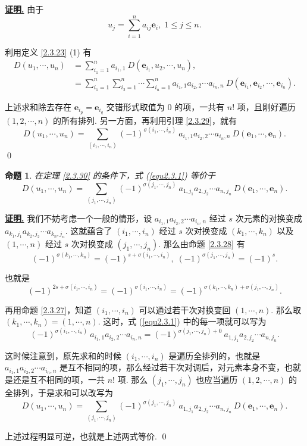 \documentclass[10pt,openany]{article}
\theoremstyle{thmstyle} %
\theoremstyle{defstyle} %
\theoremstyle{prostyle} %
\newtheorem{proposition}[theorem]{命题}
\theoremstyle{exastyle}
\theoremstyle{remstyle}
\renewenvironment{proof}[1][证明]{\par\underline{\textbf{#1.}} \;\fangsong}{\qed\par}
\newcommand{\bme}{\bm{e}}
\begin{document}
\begin{proof}
	由于
	\[ u_j=\sum_{i=1}^{n} a_{ij}\bme_i, \; 1 \leq j \leq n. \]
	
	利用定义 \ref{2.3.23} (1) 有
	\begin{align*}
		D(u_1,\cdots,u_n) &= \sum_{i_1=1}^{n} a_{i_1,1} \ D(\bme_{i_1},u_2,\cdots,u_n), \\
		&= \sum_{i_1=1}^{n} \sum_{i_2=1}^{n}\cdots \sum_{i_n=1}^{n} a_{i_1,1}a_{i_2,2}\cdots a_{i_n,n} \ D(\bme_{i_1},\bme_{i_2},\cdots,\bme_{i_n}).
	\end{align*}
	
	上述求和除去存在 \( \bme_{i_p}=\bme_{i_q} \) 交错形式取值为 0 的项，一共有 \( n! \) 项，且刚好遍历 \( (1,2,\cdots,n) \) 的所有排列. 另一方面，再利用引理 \ref{2.3.29}，就有
	\[ D(u_1,\cdots,u_n)= \sum_{(i_1,\cdots,i_n)}^{} (-1)^{\sigma(i_1,\cdots,i_n)} \ a_{i_1,1}a_{i_2,2}\cdots a_{i_n,n} \ D(\bme_1,\cdots,\bme_n). \]
\end{proof}

\begin{proposition} \label{2.3.31}
	在定理 \ref{2.3.30} 的条件下，式 (\ref{equ2.3.1}) 等价于
	\[ D(u_1,\cdots,u_n)= \sum_{(j_1,\cdots,j_n)}^{} (-1)^{\sigma(j_1,\cdots,j_n)} \ a_{1,j_1}a_{2,j_2}\cdots a_{n,j_n} \ D(\bme_1,\cdots,\bme_n). \]
\end{proposition}

\begin{proof}
	我们不妨考虑一个一般的情形，设 \( a_{i_1,1}a_{i_2,2}\cdots a_{i_n,n} \) 经过 \( s \) 次元素的对换变成 \( a_{k_1,j_1}a_{k_2,j_2}\cdots a_{k_n,j_n} \). 这就蕴含了 \( (i_1,\cdots,i_n) \) 经过 \( s \) 次对换变成 \( (k_1,\cdots,k_n) \) 以及 \( (1,\cdots,n) \) 经过 \( s \) 次对换变成 \( (j_1,\cdots,j_n) \). 那么由命题 \ref{2.3.28} 有
	\[ (-1)^{\sigma(k_1,\cdots,k_n)}=(-1)^{s+\sigma(i_1,\cdots,i_n)}, \; (-1)^{\sigma(j_1,\cdots,j_n)}=(-1)^s.\] 
	
	也就是
	\[ (-1)^{2s+\sigma(i_1,\cdots,i_n)}=(-1)^{\sigma(i_1,\cdots,i_n)}=(-1)^{\sigma(k_1,\cdots,k_n)+\sigma(j_1,\cdots,j_n)}. \]
	
	再用命题 \ref{2.3.27}，知道 \( (i_1,\cdots,i_n) \) 可以通过若干次对换变回 \( (1,\cdots,n) \). 那么取 \( (k_1,\cdots,k_n)=(1,\cdots,n) \). 这时，式 (\ref{equ2.3.1}) 中的每一项就可以写为
	\[ (-1)^{\sigma(i_1,\cdots,i_n)} \ a_{i_1,1}a_{i_2,2}\cdots a_{i_n,n} =(-1)^{\sigma(j_1,\cdots,j_n)+0} \ a_{1,j_1}a_{2,j_2}\cdots a_{n,j_n}. \]
	
	这时候注意到，原先求和的时候 \( (i_1,\cdots,i_n) \) 是遍历全排列的，也就是 \( a_{i_1,1}a_{i_2,2}\cdots a_{i_n,n} \) 是互不相同的项，那么经过若干次对调后，对元素本身不变，也就是还是互不相同的项，一共 \( n! \) 项. 那么 \( (j_1,\cdots,j_n) \) 也应当遍历 \( (1,2,\cdots,n) \) 的全排列，于是求和可以改写为
	\[ D(u_1,\cdots,u_n)= \sum_{(j_1,\cdots,j_n)}^{} (-1)^{\sigma(j_1,\cdots,j_n)} \ a_{1,j_1}a_{2,j_2}\cdots a_{n,j_n} \ D(\bme_1,\cdots,\bme_n). \]
	
	上述过程明显可逆，也就是上述两式等价.
\end{proof}
\end{document}
